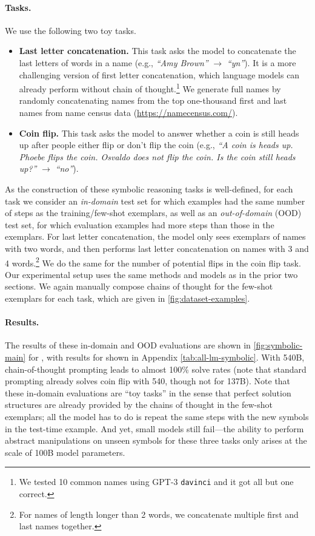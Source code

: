 \paragraph{Tasks.}
We use the following two toy tasks.
\begin{itemize}[leftmargin=*,topsep=0pt]
    \itemsep0em 
    \item \textbf{Last letter concatenation.}
    This task asks the model to concatenate the last letters of words in a name (e.g., \textit{``Amy Brown''} $\rightarrow$ \textit{``yn''}). 
    It is a more challenging version of first letter concatenation, which language models can already perform without chain of thought.\footnote{We tested 10 common names using GPT-3 \texttt{davinci} and it got all but one correct.}
    We generate full names by randomly concatenating names from the top one-thousand first and last names from name census data ({\small{\url{https://namecensus.com/}}}).
    \item \textbf{Coin flip.}
    This task asks the model to answer whether a coin is still heads up after people either flip or don't flip the coin (e.g., \textit{``A coin is heads up. Phoebe flips the coin. Osvaldo does not flip the coin. Is the coin still heads up?''} $\rightarrow$ \textit{``no''}).
\end{itemize}

As the construction of these symbolic reasoning tasks is well-defined, for each task we consider an \textit{in-domain} test set for which examples had the same number of steps as the training/few-shot exemplars, as well as an \textit{out-of-domain} (OOD) test set, for which evaluation examples had more steps than those in the exemplars. 
For last letter concatenation, the model only sees exemplars of names with two words, and then performs last letter concatenation on names with 3 and 4 words.\footnote{For names of length longer than 2 words, we concatenate multiple first and last names together.}
We do the same for the number of potential flips in the coin flip task. 
Our experimental setup uses the same methods and models as in the prior two sections.
We again manually compose chains of thought for the few-shot exemplars for each task, which are given in \cref{fig:dataset-examples}.

\paragraph{Results.}
The results of these in-domain and OOD evaluations are shown in \cref{fig:symbolic-main} for \palm{}, with results for \lamda{} shown in Appendix \cref{tab:all-lm-symbolic}.
With \palm{} 540B, chain-of-thought prompting leads to almost 100\% solve rates (note that standard prompting already solves coin flip with \palm{} 540, though not for \lamda{} 137B).
Note that these in-domain evaluations are ``toy tasks'' in the sense that perfect solution structures are already provided by the chains of thought in the few-shot exemplars; all the model has to do is repeat the same steps with the new symbols in the test-time example.
And yet, small models still fail---the ability to perform abstract manipulations on unseen symbols for these three tasks only arises at the scale of 100B model parameters.

